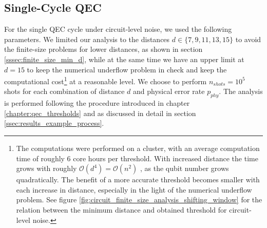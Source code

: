 

\subsection{Single-Cycle QEC}\label{ssec:results_circ_single_cycle}

For the single QEC cycle under circuit-level noise, we used the following parameters.
We limited our analysis to the distances $d \in \{7,9,11,13,15 \}$ to avoid the finite-size problems for lower distances, as shown in section \ref{sssec:finite_size_min_d}, 
while at the same time we have an upper limit at $d=15$ to keep the numerical underflow problem in check and keep the computational cost\footnote{
    The computations were performed on a cluster, with an average computation time of roughly 6 core hours per threshold.
    With increased distance the time grows with roughly $\mathcal{O}(d^4)=\mathcal{O}(n^2)$ \cite{efficient_decoding_algorithm}, as the qubit number grows quadratically.
    The benefit of a more accurate threshold becomes smaller with each increase in distance, especially in the light of the numerical underflow problem. 
    See figure \ref{fig:circuit_finite_size_analysis_shifting_window} for the relation between the minimum distance and obtained threshold for circuit-level noise. 
} at a reasonable level. 
We choose to perform $n_{shots}=10^5$ shots for each combination of distance $d$ and physical error rate $p_{phy}$. 
The analysis is performed following the procedure introduced in chapter \ref{chapter:qec_thresholds} and as discussed in detail in section \ref{ssec:results_example_process}.

